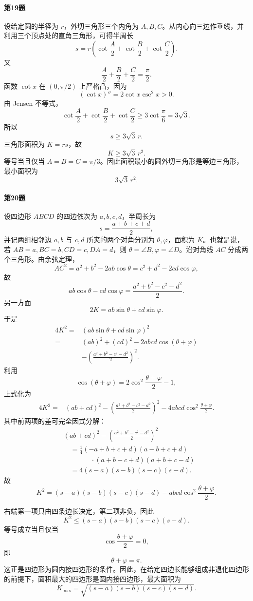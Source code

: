 \paragraph{第19题}
\begin{xsolution}
设给定圆的半径为 $r$，外切三角形三个内角为 $A,B,C$。从内心向三边作垂线，并利用三个顶点处的直角三角形，可得半周长
\[
  s=r\left(\cot\frac A2+\cot\frac B2+\cot\frac C2\right).
\]
又
\[
  \frac A2+\frac B2+\frac C2=\frac\pi2.
\]
函数 $\cot x$ 在 $(0,\pi/2)$ 上严格凸，因为
\[
  (\cot x)''=2\cot x\csc^2x>0.
\]
由 Jensen 不等式，
\[
  \cot\frac A2+\cot\frac B2+\cot\frac C2
  \ge3\cot\frac\pi6=3\sqrt3.
\]
所以
\[
  s\ge3\sqrt3\,r.
\]
三角形面积为 $K=rs$，故
\[
  K\ge3\sqrt3\,r^2.
\]
等号当且仅当 $A=B=C=\pi/3$。因此面积最小的圆外切三角形是等边三角形，最小面积为
\[
  3\sqrt3\,r^2.
\]
\end{xsolution}

\paragraph{第20题}
\begin{xsolution}
设四边形 $ABCD$ 的四边依次为 $a,b,c,d$，半周长为
\[
  s=\frac{a+b+c+d}{2},
\]
并记两组相邻边 $a,b$ 与 $c,d$ 所夹的两个对角分别为 $\theta,\varphi$，面积为 $K$。也就是说，若 $AB=a,BC=b,CD=c,DA=d$，则 $\theta=\angle B,\varphi=\angle D$。沿对角线 $AC$ 分成两个三角形。由余弦定理，
\[
  AC^2=a^2+b^2-2ab\cos\theta
  =c^2+d^2-2cd\cos\varphi,
\]
故
\[
  ab\cos\theta-cd\cos\varphi
  =\frac{a^2+b^2-c^2-d^2}{2}.
\]
另一方面
\[
  2K=ab\sin\theta+cd\sin\varphi.
\]
于是
\[
\begin{aligned}
  4K^2
  ={}&(ab\sin\theta+cd\sin\varphi)^2\\
  ={}&(ab)^2+(cd)^2-2abcd\cos(\theta+\varphi)\\
  &-\left(\frac{a^2+b^2-c^2-d^2}{2}\right)^2.
\end{aligned}
\]
利用
\[
  \cos(\theta+\varphi)=2\cos^2\frac{\theta+\varphi}{2}-1,
\]
上式化为
\[
\begin{aligned}
  4K^2
  ={}&(ab+cd)^2
  -\left(\frac{a^2+b^2-c^2-d^2}{2}\right)^2
  -4abcd\cos^2\frac{\theta+\varphi}{2}.
\end{aligned}
\]
其中前两项的差可完全因式分解：
\[
\begin{aligned}
 &(ab+cd)^2
 -\left(\frac{a^2+b^2-c^2-d^2}{2}\right)^2\\
 &\quad=\frac14(-a+b+c+d)(a-b+c+d)\\
 &\qquad\qquad\cdot(a+b-c+d)(a+b+c-d)\\
 &\quad=4(s-a)(s-b)(s-c)(s-d).
\end{aligned}
\]
故
\[
  K^2=(s-a)(s-b)(s-c)(s-d)
  -abcd\cos^2\frac{\theta+\varphi}{2}.
\]

右端第一项只由四条边长决定，第二项非负，因此
\[
  K^2\le(s-a)(s-b)(s-c)(s-d).
\]
等号成立当且仅当
\[
  \cos\frac{\theta+\varphi}{2}=0,
\]
即
\[
  \theta+\varphi=\pi.
\]
这正是四边形为圆内接四边形的条件。因此，在给定四边长能够组成非退化四边形的前提下，面积最大的四边形是圆内接四边形，最大面积为
\[
  K_{\max}
  =\sqrt{(s-a)(s-b)(s-c)(s-d)}.
\]
\end{xsolution}

